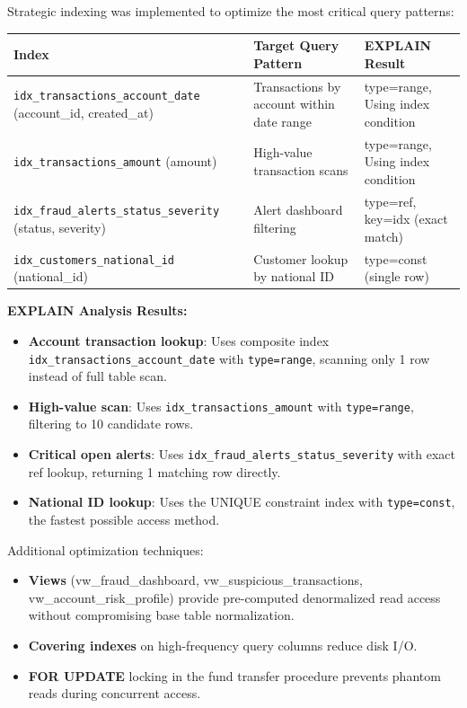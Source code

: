 \documentclass[a4paper,12pt]{article}
\begin{document}
Strategic indexing was implemented to optimize the most critical query patterns:

{\small
\begin{longtable}{|p{6cm}|p{4.5cm}|p{4cm}|}
\hline
\textbf{Index} & \textbf{Target Query Pattern} & \textbf{EXPLAIN Result} \\
\hline
\texttt{idx\_transactions\_account\_date} \newline (account\_id, created\_at) & Transactions by account within date range & type=range, Using index condition \\
\hline
\texttt{idx\_transactions\_amount} \newline (amount) & High-value transaction scans & type=range, Using index condition \\
\hline
\texttt{idx\_fraud\_alerts\_status\_severity} \newline (status, severity) & Alert dashboard filtering & type=ref, key=idx (exact match) \\
\hline
\texttt{idx\_customers\_national\_id} \newline (national\_id) & Customer lookup by national ID & type=const (single row) \\
\hline
\end{longtable}
}

\textbf{EXPLAIN Analysis Results:}
\begin{itemize}
    \item \textbf{Account transaction lookup}: Uses composite index \texttt{idx\_transactions\_account\_date} with \texttt{type=range}, scanning only 1 row instead of full table scan.
    \item \textbf{High-value scan}: Uses \texttt{idx\_transactions\_amount} with \texttt{type=range}, filtering to 10 candidate rows.
    \item \textbf{Critical open alerts}: Uses \texttt{idx\_fraud\_alerts\_status\_severity} with exact ref lookup, returning 1 matching row directly.
    \item \textbf{National ID lookup}: Uses the UNIQUE constraint index with \texttt{type=const}, the fastest possible access method.
\end{itemize}

Additional optimization techniques:
\begin{itemize}
    \item \textbf{Views} (vw\_fraud\_dashboard, vw\_suspicious\_transactions, vw\_account\_risk\_profile) provide pre-computed denormalized read access without compromising base table normalization.
    \item \textbf{Covering indexes} on high-frequency query columns reduce disk I/O.
    \item \textbf{FOR UPDATE} locking in the fund transfer procedure prevents phantom reads during concurrent access.
\end{itemize}
\end{document}
